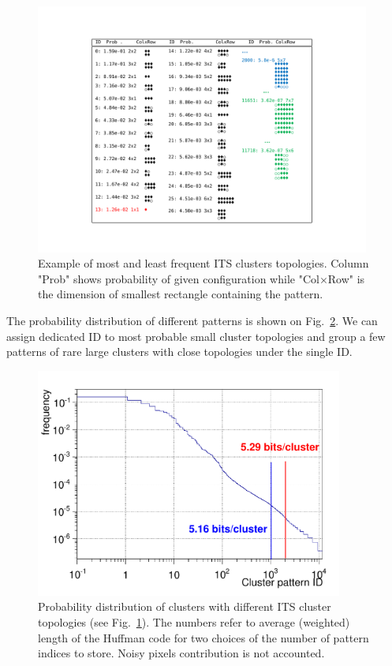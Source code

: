 \begin{figure}[h]
\centering
\includegraphics[trim=4.5cm 2cm 3.5cm 3cm , width=0.98\textwidth]{ITS/ClusPattDemo.pdf}
\caption{\label{fig:clpatt} 
Example of most and least frequent ITS clusters topologies. Column
"Prob" shows probability of given configuration while "Col$\times$Row"
is the dimension of smallest rectangle containing the pattern.}
\end{figure}

The probability
distribution of different patterns is shown on Fig.~\ref{fig:clpattHC}. We can assign dedicated ID to most probable
small cluster topologies and group a few patterns of rare large clusters with close topologies under the single ID.

\begin{figure}[h]
\centering
\includegraphics[width=0.9\textwidth]{ITS/ClusPattFreq.pdf}
\caption{\label{fig:clpattHC} 
Probability distribution of clusters with different ITS cluster topologies (see
Fig.~\ref{fig:clpatt}). The numbers refer to average (weighted) length
of the Huffman code for two choices of the number of pattern indices
to store.
Noisy pixels contribution is not accounted.
}
\end{figure}


